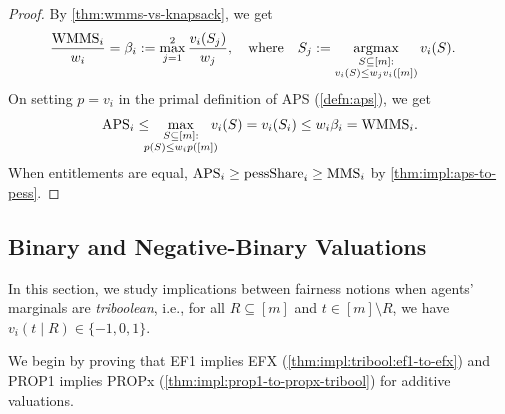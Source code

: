 \begin{proof}
By \cref{thm:wmms-vs-knapsack}, we get
\begin{align*}
& \frac{\mathrm{WMMS}_i}{w_i} = \beta_i := \max_{j=1}^2 \frac{v_i(S_j)}{w_j},
    \relax\quad\textrm{where}\quad S_j := \operatorname*{argmax}_{\substack{S \subseteq [m]:\\ v_i(S) \le w_jv_i([m])}} v_i(S).
\end{align*}
On setting $p = v_i$ in the primal definition of APS (\cref{defn:aps}), we get
\[ \APS_i \le \!\!\!\!\max_{\substack{S \subseteq [m]:\\ p(S) \le w_ip([m])}} \!\!\!\!v_i(S)
    = v_i(S_i) \le w_i\beta_i = \WMMS_i. \]
When entitlements are equal, $\mathrm{APS}_i \ge \mathrm{pessShare}_i \ge \mathrm{MMS}_i$
by \cref{thm:impl:aps-to-pess}.
\end{proof}

\subsection{Binary and Negative-Binary Valuations}
\label{sec:impls-extra:tribool}

In this section, we study implications between fairness notions when agents' marginals are \emph{triboolean},
i.e., for all $R \subseteq [m]$ and $t \in [m] \setminus R$, we have $v_i(t \mid R) \in \{-1, 0, 1\}$.

We begin by proving that EF1 implies EFX (\cref{thm:impl:tribool:ef1-to-efx})
and PROP1 implies PROPx (\cref{thm:impl:prop1-to-propx-tribool}) for additive valuations.

